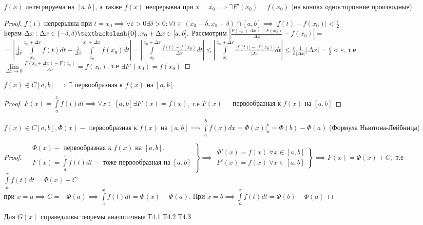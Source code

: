 \documentclass[../main.tex]{subfiles}
\begin{document}
\begin{theorem}
    $f(x)$ интегрируема на $[a,b]$, а также $f(x)$ непрерывна при $x=x_{0}\implies \exists F'(x_{0})=f(x_{0})$ (на концах односторонние производные)
\end{theorem}
\begin{proof}
    $f(t) $ непрерывна при $t=x_{0}\implies \forall \varepsilon >0 \exists \delta > 0 : \forall t\in (x_{0}-\delta,x_{0}+\delta)\cap [a,b]\implies |f(t)-f(x_{0})|<\frac{\varepsilon}{2}$\\ 
    Берем $\Delta x : \Delta x \in (-\delta,\delta) \textbackslash \{0\},x_{0}+\Delta x\in [a,b].$ Рассмотрим $\left| \frac{F(x_{0}+\Delta x)-F(x_{0})}{\Delta x}-f(x_{0}) \right|=$\\ \vspace{0.5cm}$ = \left| \frac{1}{\Delta x} \int\limits_{ x_{0}    }^{x_{0}+\Delta x} f(t)dt- \frac{1}{\Delta x}\int\limits_{x_{0}}^{x_{0}+\Delta x}f(x_{0})dt\right| =\left| \int\limits_{x_{0}}^{x_{0}+\Delta x} \frac{f(t)-f(x_{0})}{\Delta x} dt\right| \leqslant \left| \int\limits_{x_{0}}^{x_{0}+\Delta x} \frac{|f(t)|-|f(x_{0})|}{|\Delta x|}dt\right|    \leqslant \frac{\epsilon}{2} \frac{1}{|\Delta x|} |\Delta x| =\frac{\varepsilon}{2 } <\varepsilon$, т.е
    $\lim\limits_{\Delta x\to 0}\frac{F(x_{0}+\Delta x)-F(x_{0})}{\Delta x}=f(x_{0})$, т.е $ \exists F'(x_{0})=f(x_{0})$
\end{proof}
\begin{theorem}
    $f(x)\in C[a,b]\implies \exists \text{ первообразная к }f(x) \text{ на } [a,b]$
\end{theorem}
\begin{proof}
    $F(x)=\int\limits_{a   }^{x    } f(t)dt\implies \forall x\in[a,b] \exists F'(x)=f(x)$, т.е $F(x) - \text{ первообразная к } f(x) \text{ на } [a,b]$
\end{proof}
\begin{theorem}
    $f(x)\in C[a,b], \varPhi(x)-\text{ первообразная к } f(x) \text{ на }[a,b]\implies \int\limits_{a  }^{b    } f(x)dx=\varPhi(x)\bigg|_{a}^{b}=\varPhi(b)-\varPhi(a)$ (Формула Ньютона-Лейбница)
\end{theorem}
\begin{proof}
    
    $\left. \begin{aligned}&\varPhi (x) - \text{ первообразная к } f(x) \text{ на }[a,b].\\ &F(x)=\int\limits_{a}^{x}f(t)dt-\text{ тоже первообразная на }[a,b]\end{aligned}\right\} \implies \left. \begin{aligned}\varPhi'(x)=f(x)\;  \forall x\in[a,b] \\ F'(x)=f(x) \; \forall x\in[a,b]\end{aligned} \right\} \implies F(x)=\varPhi (x) +C,$ т.е $\int\limits_{a   }^{x    } f(t)dt= \varPhi(x)+C$\\ 
    при $x=a\implies C=-\varPhi(a)\implies \int\limits_{a}^{x} f(t)dt=\varPhi(x)-\varPhi(a). \text{ При } x=b \implies \int\limits_{a}^{x} f(t)dt=\varPhi(b)-\varPhi(a)$
\end{proof}
Для $G(x)$ справедливы теоремы аналогичные Т4.1 Т4.2 Т4.3
\end{document}
